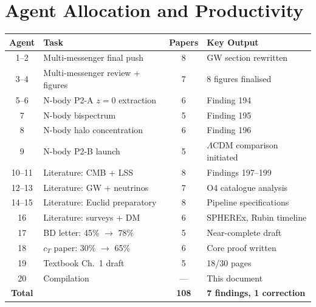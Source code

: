 \documentclass[11pt,a4paper]{article}
\begin{document}
\section{Agent Allocation and Productivity}

\begin{center}
\begin{tabular}{clcl}
\toprule
\textbf{Agent} & \textbf{Task} & \textbf{Papers} & \textbf{Key Output} \\
\midrule
1--2 & Multi-messenger final push & 8 & GW section rewritten \\
3--4 & Multi-messenger review + figures & 7 & 8 figures finalised \\
5--6 & N-body P2-A $z=0$ extraction & 6 & Finding 194 \\
7 & N-body bispectrum & 5 & Finding 195 \\
8 & N-body halo concentration & 6 & Finding 196 \\
9 & N-body P2-B launch & 5 & $\Lambda$CDM comparison initiated \\
10--11 & Literature: CMB + LSS & 8 & Findings 197--199 \\
12--13 & Literature: GW + neutrinos & 7 & O4 catalogue analysis \\
14--15 & Literature: Euclid preparatory & 8 & Pipeline specifications \\
16 & Literature: surveys + DM & 6 & SPHEREx, Rubin timeline \\
17 & BD letter: 45\% $\to$ 78\% & 5 & Near-complete draft \\
18 & $c_T$ paper: 30\% $\to$ 65\% & 6 & Core proof written \\
19 & Textbook Ch.\ 1 draft & 5 & 18/30 pages \\
20 & Compilation & --- & This document \\
\midrule
\textbf{Total} & & \textbf{108} & \textbf{7 findings, 1 correction} \\
\bottomrule
\end{tabular}
\end{center}
\end{document}
